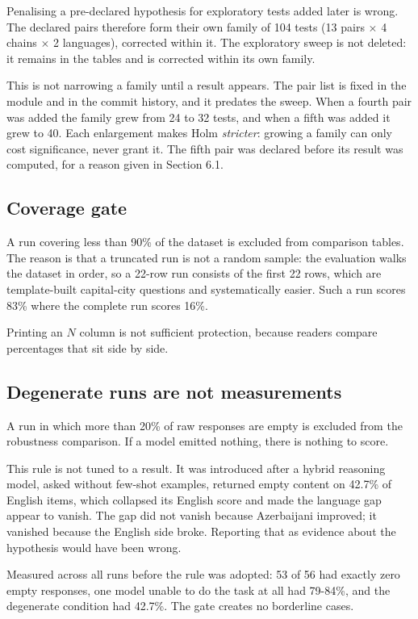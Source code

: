 \documentclass[final]{clv2025}
\begin{document}
Penalising a pre-declared hypothesis for exploratory tests added later is
wrong. The declared pairs therefore form their own family of 104 tests (13
pairs $\times$ 4 chains $\times$ 2 languages), corrected within it. The exploratory
sweep is not deleted: it remains in the tables and is corrected within its own
family.

This is not narrowing a family until a result appears. The pair list is fixed
in the module and in the commit history, and it predates the sweep. When a
fourth pair was added the family grew from 24 to 32 tests, and when a fifth was
added it grew to 40. Each enlargement makes Holm \emph{stricter}: growing a
family can only cost significance, never grant it. The fifth pair was declared
before its result was computed, for a reason given in Section 6.1.

\subsection{Coverage gate}

A run covering less than 90\% of the dataset is excluded from comparison
tables. The reason is that a truncated run is not a random sample: the
evaluation walks the dataset in order, so a 22-row run consists of the first 22
rows, which are template-built capital-city questions and systematically
easier. Such a run scores 83\% where the complete run scores 16\%.

Printing an $N$ column is not sufficient protection, because readers compare
percentages that sit side by side.

\subsection{Degenerate runs are not measurements}

A run in which more than 20\% of raw responses are empty is excluded from the
robustness comparison. If a model emitted nothing, there is nothing to score.

This rule is not tuned to a result. It was introduced after a hybrid reasoning
model, asked without few-shot examples, returned empty content on 42.7\% of
English items, which collapsed its English score and made the language gap
appear to vanish. The gap did not vanish because Azerbaijani improved; it
vanished because the English side broke. Reporting that as evidence about the
hypothesis would have been wrong.

Measured across all runs before the rule was adopted: 53 of 56 had exactly zero
empty responses, one model unable to do the task at all had 79-84\%, and the
degenerate condition had 42.7\%. The gate creates no borderline cases.
\end{document}
